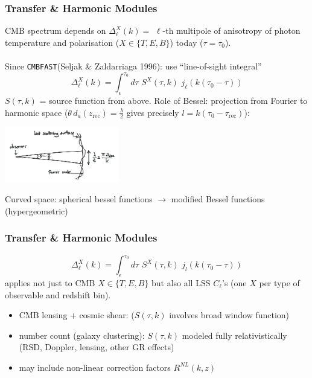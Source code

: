 \begin{frame}[fragile]
\frametitle{Transfer \& Harmonic Modules}

CMB spectrum depends on $\Delta^X_\ell(k)=$ $\ell$-th multipole of anisotropy of photon temperature and polarisation ($X\in\{T,E,B\}$) today ($\tau=\tau_0$).
\\
\mbox{}\\
Since {\Red \tt CMBFAST}(Seljak \& Zaldarriaga 1996): use ``line-of-sight integral''
$$
\Delta^X_\ell(k)= \int_\epsilon^{\tau_0} d \tau \,\, S^X\!(\tau,k) \,\, j_\ell(k(\tau_0-\tau))
$$
$S(\tau,k)$ = source function from above.
Role of Bessel: projection from Fourier to harmonic space ($\theta \, d_a(z_\mathrm{rec}) = \frac{\lambda}{2}$ gives precisely $l=k(\tau_0-\tau_\mathrm{rec})$):\\
\begin{center}
	\includegraphics[width=5cm,angle=0]{Figures/smallangle.png}\\
\end{center}
Curved space: spherical bessel functions $\rightarrow$ modified Bessel functions (hypergeometric)
\end{frame}

\begin{frame}[fragile]
\frametitle{Transfer \& Harmonic Modules}
$$
\Delta^X_\ell(k)= \int_\epsilon^{\tau_0} d \tau \,\, S^X\!(\tau,k) \,\, j_l(k(\tau_0-\tau))
$$
applies not just to CMB $X\in\{T,E,B\}$ but also all LSS $C_\ell$'s (one $X$ per type of observable and redshift bin).
\begin{itemize}
\item CMB lensing + cosmic shear: ($S(\tau,k)$ involves broad window function)
\item number count (galaxy clustering): $S(\tau,k)$ modeled fully relativistically (RSD, Doppler, lensing, other GR effects) 
\item may include non-linear correction factors $R^{NL}(k,z)$
\end{itemize}

\end{frame}  





